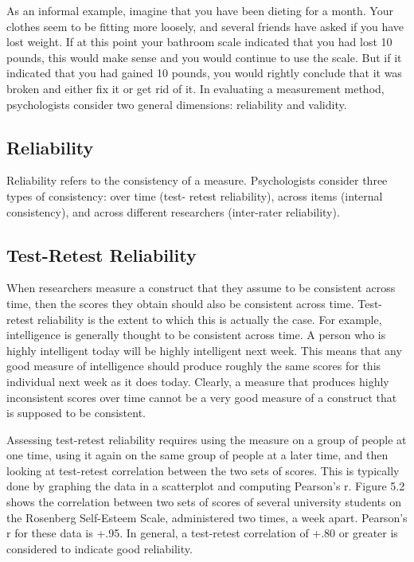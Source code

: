 As an informal example, imagine that you have been dieting for a month. Your clothes seem to be fitting more loosely, and several friends have asked if you have lost weight. If at this point your bathroom scale indicated that you had lost 10 pounds, this would make sense and you would continue to use the scale. But if it indicated that you had gained 10 pounds, you would rightly conclude that it was broken and either fix it or get rid of it. In evaluating a measurement method, psychologists consider two general dimensions: reliability and validity.

\subsection{Reliability}

Reliability refers to the consistency of a measure. Psychologists consider three types of consistency: over time (test- retest reliability), across items (internal consistency), and across different researchers (inter-rater reliability).

\subsection{Test-Retest Reliability}


When researchers measure a construct that they assume to be consistent across time, then the scores they obtain should also be consistent across time. Test-retest reliability is the extent to which this is actually the case. For example, intelligence is generally thought to be consistent across time. A person who is highly intelligent today will be highly intelligent next week. This means that any good measure of intelligence should produce roughly the same scores for this individual next week as it does today. Clearly, a measure that produces highly inconsistent scores over time cannot be a very good measure of a construct that is supposed to be consistent.


Assessing test-retest reliability requires using the measure on a group of people at one time, using it again on the same group of people at a later time, and then looking at test-retest correlation between the two sets of scores. This is typically done by graphing the data in a scatterplot and computing Pearson's r. Figure 5.2 shows the correlation between two sets of scores of several university students on the Rosenberg Self-Esteem Scale, administered two times, a week apart. Pearson's r for these data is +.95. In general, a test-retest correlation of +.80 or greater is considered to indicate good reliability.



